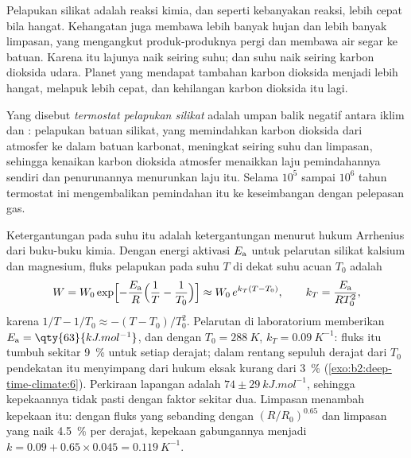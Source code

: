 Pelapukan silikat adalah reaksi kimia, dan seperti kebanyakan reaksi, lebih cepat bila hangat. Kehangatan
juga membawa lebih banyak hujan dan lebih banyak limpasan, yang mengangkut produk-produknya pergi dan membawa air segar ke
batuan. Karena itu lajunya naik seiring suhu; dan suhu naik seiring karbon dioksida
udara. Planet yang mendapat tambahan karbon dioksida menjadi lebih hangat, melapuk lebih cepat, dan kehilangan karbon dioksida itu lagi.

\begin{definition}\label{def:b2:deep-time-climate:thermostat}
Yang disebut \emph{termostat pelapukan silikat} adalah umpan balik
negatif antara iklim dan : pelapukan batuan silikat, yang
memindahkan karbon dioksida dari atmosfer ke dalam batuan karbonat, meningkat seiring suhu dan
limpasan, sehingga kenaikan karbon dioksida atmosfer menaikkan laju pemindahannya sendiri dan
penurunannya menurunkan laju itu. Selama $10^5$ sampai $10^6$ tahun termostat ini mengembalikan pemindahan itu ke keseimbangan dengan
pelepasan gas.
\end{definition}

Ketergantungan pada suhu itu adalah ketergantungan menurut hukum Arrhenius dari buku-buku kimia. Dengan energi
aktivasi $E_{\text a}$ untuk pelarutan silikat kalsium dan magnesium, fluks pelapukan pada
suhu $T$ di dekat suhu acuan $T_0$ adalah
\[
  W = W_0 \exp\Bigl[-\frac{E_{\text a}}{R}\Bigl(\frac1T - \frac1{T_0}\Bigr)\Bigr]
  \approx W_0\, e^{k_T (T - T_0)}, \qquad k_T = \frac{E_{\text a}}{R T_0^2},
\]
karena $1/T - 1/T_0 \approx -(T - T_0)/T_0^2$. Pelarutan di laboratorium memberikan $E_{\text a} =
\qty{63}{kJ.mol^{-1}}$, dan dengan $T_0 = \qty{288}{K}$, $k_T = \qty{0.09}{K^{-1}}$: fluks itu tumbuh
sekitar \qty{9}{\percent} untuk setiap derajat; dalam rentang sepuluh derajat dari $T_0$ pendekatan itu menyimpang
dari hukum eksak kurang dari \qty{3}{\percent} (\cref{exo:b2:deep-time-climate:6}). Perkiraan lapangan adalah
$74 \pm \qty{29}{kJ.mol^{-1}}$, sehingga kepekaannya tidak pasti dengan faktor sekitar dua. Limpasan
menambah kepekaan itu: dengan fluks yang sebanding dengan $(R/R_0)^{0.65}$ dan limpasan yang naik
\qty{4.5}{\percent} per derajat, kepekaan gabungannya menjadi $k = 0.09 + 0.65\times0.045 =
\qty{0.119}{K^{-1}}$.

